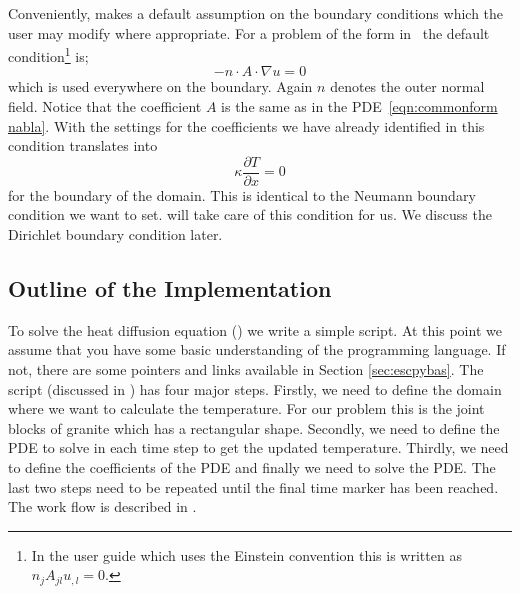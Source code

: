 Conveniently, \esc makes a default assumption on the boundary conditions which
the user may modify where appropriate. 
For a problem of the form in~ the default
condition\footnote{In the \esc user guide which uses the Einstein convention
this is written as 
$n_{j}A_{jl} u_{,l}=0$.} is;
\begin{equation}\label{NEUMAN 2}
-n\cdot A \cdot\nabla u = 0 
\end{equation}
which is used everywhere on the boundary. Again $n$ denotes the outer normal
field. 
Notice that the coefficient $A$ is the same as in the \esc
PDE~\ref{eqn:commonform nabla}. 
With the settings for the coefficients we have already identified in
 this
condition translates into 
\begin{equation}\label{NEUMAN 2b}
\kappa \frac{\partial T}{\partial x} = 0 
\end{equation}
for the boundary of the domain. This is identical to the Neumann boundary
condition we want to set. \esc will take care of this condition for us. We
discuss the Dirichlet boundary condition later.

\subsection{Outline of the Implementation}
\label{sec:outline}
To solve the heat diffusion equation () we write a simple \pyt
script. At this point we assume that you have some basic understanding of the
\pyt programming language. If not, there are some pointers and links available
in Section \ref{sec:escpybas}. The script (discussed in ) has
four major steps. Firstly, we need to define the domain where we want to 
calculate the temperature. For our problem this is the joint blocks of granite
which has a rectangular shape. Secondly, we need to define the PDE to solve in
each time step to get the updated temperature. Thirdly, we need to define the
coefficients of the PDE and finally we need to solve the PDE. The last two steps
need to be repeated until the final time marker has been reached. The work flow
is described in .

